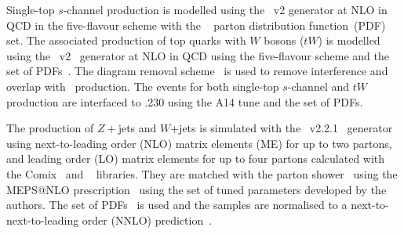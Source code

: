 \documentclass[letterpaper,12pt]{article}
\begin{document}
Single-top $s$-channel production is modelled using the \powhegbox~v2 %
generator at NLO in QCD in the five-flavour scheme with the \nnpdfnlo~\cite{Ball:2014uwa} parton distribution function~(PDF) set.
%
The associated production of top quarks with $W$ bosons ($tW$) is
modelled using the
\powhegbox~v2~\cite{Re:2010bp,Nason:2004rx,Frixione:2007vw,Alioli:2010xd}
generator at NLO in QCD using the five-flavour scheme and the
\nnpdfnlo set of PDFs~\cite{Ball:2014uwa}.
The diagram removal scheme~\cite{Frixione:2008yi} is used to
remove interference and overlap with \ttbar\ production. 
The events for both single-top $s$-channel and $tW$ production 
are interfaced to \pythia.230%
using the A14 tune%
and the \nnpdftwo set of PDFs. %

The production of $Z+$jets and $W$+jets is simulated with the
\sherpa~v2.2.1~\cite{Bothmann:2019yzt}
generator using next-to-leading order (NLO) matrix elements (ME) for up to two partons, and leading order (LO) matrix elements
for up to four partons calculated with the Comix~\cite{Gleisberg:2008fv}
and \openloops~\cite{Buccioni:2019sur,Cascioli:2011va,Denner:2016kdg} libraries. They
are matched with the \sherpa parton shower~\cite{Schumann:2007mg} using the MEPS@NLO
prescription~\cite{Hoeche:2011fd,Hoeche:2012yf,Catani:2001cc,Hoeche:2009rj}
using the set of tuned parameters developed by the \sherpa authors.
The \nnpdfnnlo set of PDFs~\cite{Ball:2014uwa} is used and the samples
are normalised to a next-to-next-to-leading order (NNLO)
prediction~\cite{Anastasiou:2003ds}.
\end{document}
